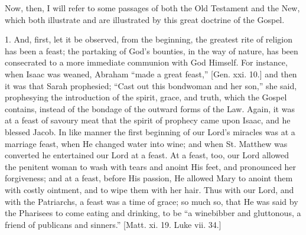 Now, then, I will refer to some passages of both the Old Testament
and the New, which both illustrate and are illustrated by this great
doctrine of the Gospel.

1. And, first, let it be observed, from the beginning, the greatest
rite of religion has been a feast; the partaking of God's bounties, in
the way of nature, has been consecrated to a more immediate communion
with God Himself. For instance, when Isaac was weaned, Abraham
``made a great feast,'' [Gen. xxi. 10.] and then it was that
Sarah prophesied; ``Cast out this bondwoman and her son,'' she
said, prophesying the introduction of the spirit, grace, and truth,
which the Gospel contains, instead of the bondage of the outward forms
of the Law. Again, it was at a feast of savoury meat that the spirit
of prophecy came upon Isaac, and he blessed Jacob. In like manner the
first beginning of our Lord's miracles was at a marriage feast, when
He changed water into wine; and when St. Matthew was converted he
entertained our Lord at a feast. At a feast, too, our Lord allowed the
penitent woman to wash with tears and anoint His feet, and pronounced
her forgiveness; and at a feast, before His passion, He allowed Mary
to anoint them with costly ointment, and to wipe them with her hair.
Thus with our Lord, and with the Patriarchs, a feast was a time of
grace; so much so, that He was said by the Pharisees to come eating
and drinking, to be ``a winebibber and gluttonous, a friend of
publicans and sinners.'' [Matt. xi. 19. Luke vii. 34.]


